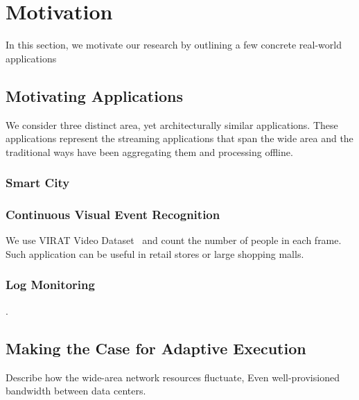 \section{Motivation}
\label{sec:motivation}

In this section, we motivate our research by outlining a few concrete real-world
applications

\subsection{Motivating Applications}
\label{sec:motiv-appl}

We consider three distinct area, yet architecturally similar applications. These
applications represent the streaming applications that span the wide area and
the traditional ways have been aggregating them and processing offline.

\subsubsection{Smart City}
\label{sec:smart-city}


\subsubsection{Continuous Visual Event Recognition}
\label{sec:cont-visu-event}

We use VIRAT Video Dataset~\cite{oh2011large} and count the number of people in
each frame. Such application can be useful in retail stores or large shopping
malls.

\subsubsection{Log Monitoring}
\label{sec:log-monitoring}

.

\subsection{Making the Case for Adaptive Execution}
\label{sec:making-case-adapt}

Describe how the wide-area network resources fluctuate, Even well-provisioned
bandwidth between data centers.

